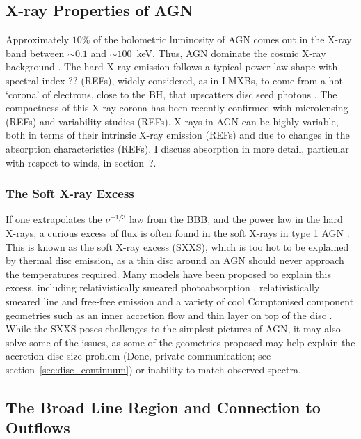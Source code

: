 \subsection{X-ray Properties of AGN}

Approximately $10\%$ of the bolometric luminosity of AGN
comes out in the X-ray band between $\sim0.1$ and $\sim100$~keV.
Thus, AGN dominate the cosmic X-ray background \citep{madau1994}.
The hard X-ray emission follows a typical power law shape with spectral
index ?? (REFs), widely considered, as in LMXBs, to come from a hot `corona' of 
electrons, close to the BH, that upscatters disc seed photons
\citep[e.g.][]{haardt1991}. The compactness of this X-ray corona
has been recently confirmed with microlensing (REFs) 
and variability studies (REFs). 
X-rays in AGN can be highly variable, both in terms of their intrinsic 
X-ray emission (REFs) and due to changes in the absorption characteristics (REFs).
I discuss absorption in more detail, particular with respect to winds, in section~?.


\subsubsection{The Soft X-ray Excess}
\label{sec:sxxs}

If one extrapolates the $\nu^{-1/3}$ law from the BBB, and the power law
in the hard X-rays, a curious excess of flux is often found in the soft X-rays
in type 1 AGN \citep[see figure~\ref{fig:quasar_sed}, from][]{elvis1994}. 
This is known as the soft X-ray excess (SXXS), which is too 
hot to be explained by thermal disc emission, as a thin disc around an AGN should
never approach the temperatures required. Many models have been proposed to
explain this excess, including relativistically smeared 
photoabsorption \citep{gierlinskidone2004b,gierlinskidone2006}, 
relativistically smeared line and free-free emission \citep{rossfabian2005} 
and a variety of cool Comptonised component geometries such as an 
inner accretion flow \citep{magdiarz1998,done2012} 
and thin layer on top of the disc \citep{januik2001}. 
While the SXXS poses challenges to
the simplest pictures of AGN, it may also solve some of the issues, as
some of the geometries proposed may help explain the 
accretion disc size problem (Done, private communication; 
see section~\ref{sec:disc_continuum})
or inability to match observed spectra.




\subsection{The Broad Line Region and Connection to Outflows}

